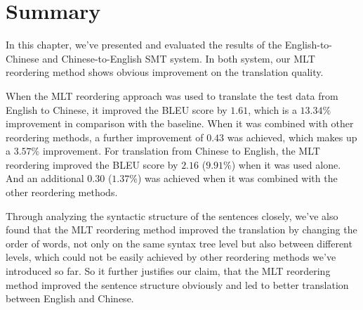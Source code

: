 \section{Summary}
\label{ch:Evaluation:sec:Conclusion}

In this chapter, we've presented and evaluated the results of the English-to-Chinese and Chinese-to-English SMT system. In both system, our MLT reordering method shows obvious improvement on the translation quality.

When the MLT reordering approach was used to translate the test data from English to Chinese, it improved the BLEU score by $1.61$, which is a $13.34\%$ improvement in comparison with the baseline. When it was combined with other reordering methods, a further improvement of $0.43$ was achieved, which makes up a $3.57\%$ improvement. For translation from Chinese to English, the 
MLT reordering improved the BLEU score by $2.16$ ($9.91\%$) when it was used alone. And an additional $0.30$ ($1.37\%$) was achieved when it was combined with the other reordering methods.

Through analyzing the syntactic structure of the sentences closely, we've also found that the MLT reordering method improved the translation by changing the order of words, not only on the same syntax tree level but also between different levels, which could not be easily achieved by other reordering methods we've introduced so far. So it further justifies our claim, that the MLT reordering method improved the sentence structure obviously and led to better translation between English and Chinese.
